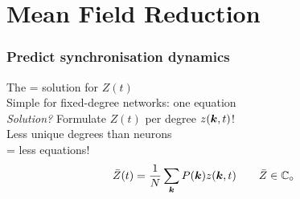 \section{\theory Mean Field Reduction}
\begin{frame}
\frametitle{Predict synchronisation dynamics} 
The \MFR = solution for $Z(t)$\\ 
\tabitem Simple for fixed-degree networks: one equation\\[0.5cm]

\textsl{Solution?} Formulate $Z(t)$ per degree $z({\boldsymbol{k}},t)$!\\
\tabitem Less unique degrees than neurons \\
\tabitem = less equations! \\
\begin{align*}
\bar{Z}(t) &= \frac{1}{N} \sum_{{\boldsymbol{k}}} P({\boldsymbol{k}}) z({\boldsymbol{k}}, t) \qquad \bar{Z} \in \mathbb{C}_\circ \label{eq:OttAntonsenMeanField}
\end{align*}
\end{frame}

